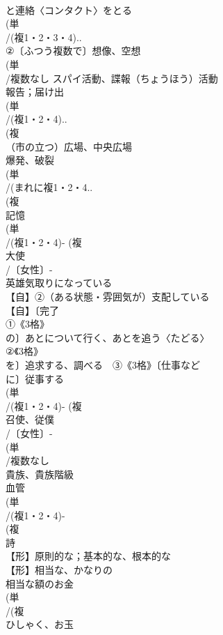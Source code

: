 \documentclass[8pt]{extreport}
\begin{document}
\begin{CJK}{UTF8}{min}
\\	と連絡〈コンタクト〉をとる
\\	(単
\\	/(複1・2・3・4)..
\\	②〔ふつう複数で〕想像、空想
\\	(単
\\	/複数なし スパイ活動、諜報（ちょうほう）活動 
\\	報告；届け出 
\\	(単
\\	/(複1・2・4)..
\\	(複
\\	（市の立つ）広場、中央広場
\\	爆発、破裂 
\\	(単
\\	/(まれに複1・2・4..
\\	(複
\\	記憶
\\	(単
\\	/(複1・2・4)- (複
\\	大使 
\\	/〔女性〕-
\\	英雄気取りになっている
\\	【自】②（ある状態・雰囲気が）支配している
\\	【自】〔完了
\\	①《3格》
\\	の〕あとについて行く、あとを追う〈たどる〉
\\	②《3格》
\\	を〕追求する、調べる　③《3格》〔仕事など
\\	に〕従事する
\\	(単
\\	/(複1・2・4)- (複
\\	召使、従僕 
\\	/〔女性〕-
\\	(単
\\	/複数なし 
\\	貴族、貴族階級 
\\	血管
\\	(単
\\	/(複1・2・4)-
\\	(複
\\	詩 
\\	【形】原則的な；基本的な、根本的な
\\	【形】相当な、かなりの 
\\	相当な額のお金 
\\	(単
\\	/(複
\\	ひしゃく、お玉 

\end{CJK}
\end{document}
